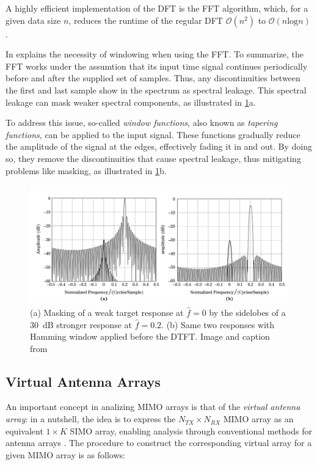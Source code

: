 A highly efficient implementation of the DFT is the FFT algorithm, which,
for a given data size $n$, reduces the runtime of the regular DFT $\mathcal O(n^2)$ to $\mathcal O(n\text{log}n)$ \cite{fft_algorithm}.

In \cite[pp. 509--513]{richards} explains the necessity of windowing when using the FFT.
To summarize, the FFT works under the assumtion that its input time signal continues periodically before and after the supplied set of samples.
Thus, any discontinuities between the first and last sample show in the spectrum as spectral leakage.
This spectral leakage can mask weaker spectral components, as illustrated in \cref{fig:richards_sidelobes}a.

To address this issue, so-called \emph{window functions}, also known as \emph{tapering functions},
can be applied to the input signal. These functions gradually reduce the amplitude of the signal at the edges,
effectively fading it in and out. By doing so, they remove the discontinuities that cause spectral leakage,
thus mitigating problems like masking, as illustrated in \cref{fig:richards_sidelobes}b.
\begin{figure}
    \centering
    \includegraphics[width=\textwidth]{../figures/richards_sidelobe_masking.pdf}
    \caption{
        (a) Masking of a weak target response at $\hat f = 0$ by the sidelobes of a \SI{30}{\dB} stronger response at $\hat f = 0.2$.
        (b) Same two responses with Hamming window applied before the DTFT.
        Image and caption from \cite[p.510]{richards}}
    \label{fig:richards_sidelobes}
\end{figure}


\subsection{Virtual Antenna Arrays}
\label{sec:virtual_array}
An important concept in analizing MIMO arrays is that of the \emph{virtual antenna array}:
in a nutshell, the idea is to express the $N_{TX} \times N_{RX}$ MIMO array as an equivalent $1\times K$ SIMO array,
enabling analysis through conventional methods for antenna arrays \cite{virtual_antenna_arrays}.
The procedure to construct the corresponding virtual array for a given MIMO array is as follows:

